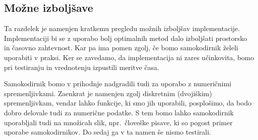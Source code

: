 \documentclass[12pt,a4paper,twoside]{article}
\theoremstyle{definition} %
\theoremstyle{plain} %
\numberwithin{equation}{section}  %
\begin{document}


\subsection{Možne izboljšave}
\label{mozne-izboljsave}


Ta razdelek je namenjen kratkemu pregledu možnih izboljšav implementacije.
Implementaciji bi se z uporabo bolj optimalnih metod dalo izboljšati prostorsko in časovno zahtevnost.
Kar pa ima pomen zgolj, če bomo samokodirnik želeli uporabiti v praksi.
Ker se zavedamo, da implementacija ni zares učinkovita, bomo pri testiranju in vrednotenju izpustili meritve časa.

Samokodirnik bomo v prihodnje nadgradili tudi za uporabo z numeričnimi spremenljivkami.
Zaenkrat je namenjen zgolj diskretnim (dvojiškim) spremenljivkam, vendar lahko funkcije, ki smo jih uporabili, posplošimo, da bodo dobro delovale tudi za numerične podatke.
S tem bomo lahko samokodirnik uporabljali tudi na množicah slik, npr.\ človeške pisave, ki so pogost primer uporabe samokodirnikov.
Do sedaj ga v ta namen še nismo testirali.


\end{document}
